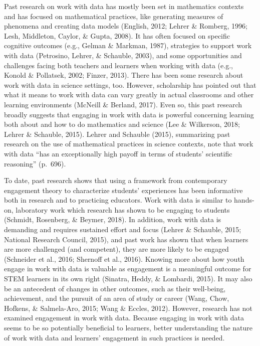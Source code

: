 \documentclass[]{book}
\theoremstyle{definition}
\theoremstyle{definition}
\theoremstyle{definition}
\theoremstyle{remark}
\begin{document}
Past research on work with data has mostly been set in mathematics
contexts and has focused on mathematical practices, like generating
measures of phenomena and creating data models (English, 2012; Lehrer \&
Romberg, 1996; Lesh, Middleton, Caylor, \& Gupta, 2008). It has often
focused on specific cognitive outcomes (e.g., Gelman \& Markman, 1987),
strategies to support work with data (Petrosino, Lehrer, \& Schauble,
2003), and some opportunities and challenges facing both teachers and
learners when working with data (e.g., Konold \& Pollatsek, 2002;
Finzer, 2013). There has been some research about work with data in
science settings, too. However, scholarship has pointed out that what it
means to work with data can vary greatly in actual classrooms and other
learning environments (McNeill \& Berland, 2017). Even so, this past
research broadly suggests that engaging in work with data is powerful
concerning learning both about and how to do mathematics and science
(Lee \& Wilkerson, 2018; Lehrer \& Schauble, 2015). Lehrer and Schauble
(2015), summarizing past research on the use of mathematical practices
in science contexts, note that work with data ``has an exceptionally
high payoff in terms of students' scientific reasoning'' (p.~696).

To date, past research shows that using a framework from contemporary
engagement theory to characterize students' experiences has been
informative both in research and to practicing educators. Work with data
is similar to hands-on, laboratory work which research has shown to be
engaging to students (Schmidt, Rosenberg, \& Beymer, 2018). In addition,
work with data is demanding and requires sustained effort and focus
(Lehrer \& Schauble, 2015; National Research Council, 2015), and past
work has shown that when learners are more challenged (and competent),
they are more likely to be engaged (Schneider et al., 2016; Shernoff et
al., 2016). Knowing more about how youth engage in work with data is
valuable as engagement is a meaningful outcome for STEM learners in its
own right (Sinatra, Heddy, \& Lombardi, 2015). It may also be an
antecedent of changes in other outcomes, such as their well-being,
achievement, and the pursuit of an area of study or career (Wang, Chow,
Hofkens, \& Salmela-Aro, 2015; Wang \& Eccles, 2012). However, research
has not examined engagement in work with data. Because engaging in work
with data seems to be so potentially beneficial to learners, better
understanding the nature of work with data and learners' engagement in
such practices is needed.
\end{document}
